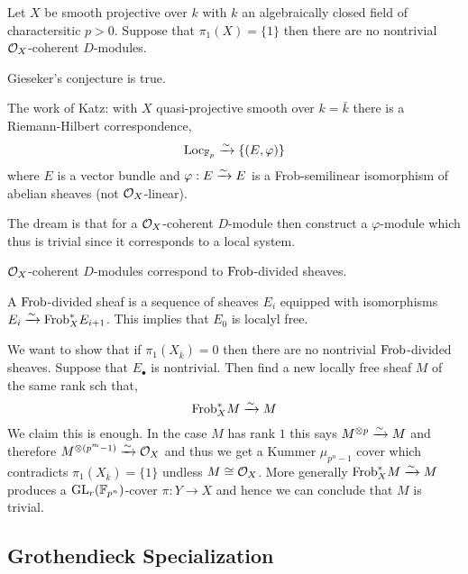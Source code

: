 \documentclass[12pt]{article}
\begin{document}
\begin{conj}[Gieseker, 1975]
Let $X$ be smooth projective over $k$ with $k$ an algebraically closed field of charactersitic $p > 0$. Suppose that $\pi_1(X) = \{ 1 \}$ then there are no nontrivial $\mathcal{O}_{X}$-coherent $D$-modules. 
\end{conj}

\begin{theorem}[E-Mehta, 2010]
Gieseker's conjecture is true. 
\end{theorem}

\begin{rmk}
The work of Katz: with $X$ quasi-projective smooth over $k = \bar{k}$ there is a Riemann-Hilbert correspondence,
\[ \mathrm{Loc}_{\mathbb{F}_p} \xrightarrow{\sim} \{ (E, \varphi) \} \]
where $E$ is a vector bundle and $\varphi : E \xrightarrow{\sim} E$ is a Frob-semilinear isomorphism of abelian sheaves (not $\mathcal{O}_{X}$-linear). 
\end{rmk}

\begin{rmk}
The dream is that for a $\mathcal{O}_{X}$-coherent $D$-module then construct a $\varphi$-module which thus is trivial since it corresponds to a local system. 
\end{rmk}

\begin{prop}
$\mathcal{O}_{X}$-coherent $D$-modules correspond to $\mathrm{Frob}$-divided sheaves.
\end{prop}

\begin{rmk}
A $\mathrm{Frob}$-divided sheaf is a sequence of sheaves $E_i$ equipped with isomorphisms $E_i \xrightarrow{\sim} \mathrm{Frob}^*_X E_{i+1}$. This implies that $E_0$ is localyl free. 
\end{rmk}

\begin{rmk}
We want to show that if $\pi_1(X_{\overline{k}}) = 0$ then there are no nontrivial $\mathrm{Frob}$-divided sheaves. Suppose that $E_\bullet$ is nontrivial. Then find a new locally free sheaf $M$ of the same rank sch that,
\[ \mathrm{Frob}_X^* M \xrightarrow{\sim} M \]
We claim this is enough. In the case $M$ has rank $1$ this says $M^{\otimes p} \xrightarrow{\sim} M$ and therefore $M^{\otimes (p^m - 1)} \xrightarrow{\sim} \mathcal{O}_{X}$ and thus we get a Kummer $\mu_{p^{n}-1}$ cover which contradicts $\pi_1(X_{\overline{k}}) = \{ 1 \}$ undless $M \cong \mathcal{O}_{X}$. More generally $\mathrm{Frob}_X^* M \xrightarrow{\sim} M$ produces a $\mathrm{GL}_r(\mathbb{F}_{p^n})$-cover $\pi : Y \to X$ and hence we can conclude that $M$ is trivial.
\end{rmk}

\subsection{Grothendieck Specialization}
\end{document}
